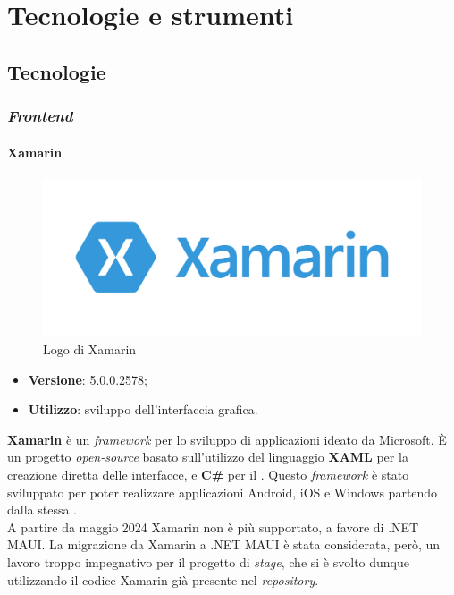 \chapter{Tecnologie e strumenti}
\label{cap:tecnologie-strumenti}


\section{Tecnologie}

\subsection{\textit{Frontend}}

\subsubsection{Xamarin}

\begin{figure}[H]
    \centering 
    \includegraphics[width=0.4\columnwidth]{images/loghi/xamarin-logo.png} 
    \caption{Logo di Xamarin}
\end{figure}

\begin{itemize}
    \item \textbf{Versione}: 5.0.0.2578;
    \item \textbf{Utilizzo}: sviluppo dell'interfaccia grafica.
\end{itemize}

\noindent \textbf{Xamarin} è un \textit{framework} per lo sviluppo di applicazioni ideato da Microsoft. È un progetto \textit{open-source} basato sull'utilizzo del linguaggio \textbf{XAML} per la creazione diretta delle interfacce, e \textbf{C\#} per il \textit{}. Questo \textit{framework} è stato sviluppato per poter realizzare applicazioni Android, iOS e Windows partendo dalla stessa \textit{}.\\
A partire da maggio 2024 Xamarin non è più supportato, a favore di .NET MAUI. La migrazione da Xamarin a .NET MAUI è stata considerata, però, un lavoro troppo impegnativo per il progetto di \textit{stage}, che si è svolto dunque utilizzando il codice Xamarin già presente nel \textit{repository}.

